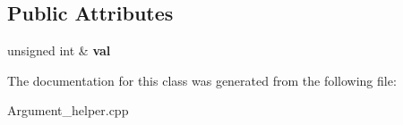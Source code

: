 \subsection*{Public Attributes}
\begin{DoxyCompactItemize}
\item 
\hypertarget{classdsr_1_1_argument__helper_1_1_u_int_target_a67d64513611e9c34d4b64ff021338878}{
unsigned int \& {\bfseries val}}
\label{classdsr_1_1_argument__helper_1_1_u_int_target_a67d64513611e9c34d4b64ff021338878}

\end{DoxyCompactItemize}


The documentation for this class was generated from the following file:\begin{DoxyCompactItemize}
\item 
Argument\_\-helper.cpp\end{DoxyCompactItemize}
